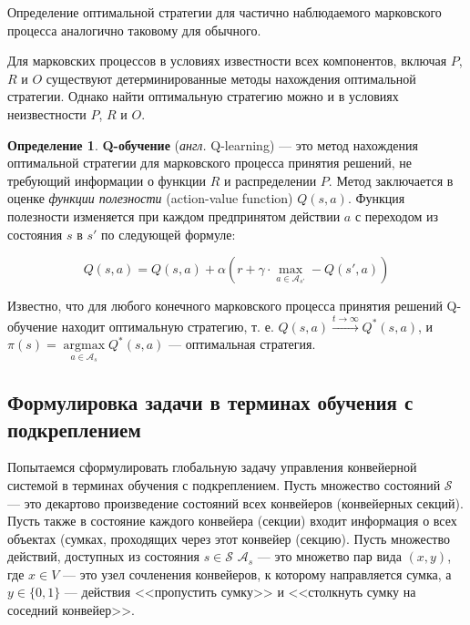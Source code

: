 \documentclass[specification,annotation,times]{itmo-student-thesis}
\DeclareMathOperator{\argmax}{argmax}
\theoremstyle{definition}
\newtheorem{definition-ru}{Определение}
\begin{document}
Определение оптимальной стратегии для частично наблюдаемого марковского процесса
аналогично таковому для обычного.

Для марковских процессов в условиях известности всех компонентов, включая $P$,
$R$ и $O$ существуют детерминированные методы нахождения оптимальной стратегии.
Однако найти оптимальную стратегию можно и в условиях неизвестности $P$, $R$ и $O$.

\begin{definition-ru}
  \textbf{Q-обучение} (\textit{англ.} Q-learning) \cite{q-learning-orig} --- это метод нахождения
  оптимальной стратегии для марковского процесса принятия решений, не требующий
  информации о функции $R$ и распределении $P$. Метод заключается в оценке
  \textit{функции полезности} (action-value function)
  $Q(s,a)$. Функция полезности изменяется при каждом предпринятом действии $a$ с
  переходом из состояния $s$ в $s'$ по следующей формуле:

  \begin{equation}
    Q(s, a) = Q(s, a) + \alpha \left( r +
    \gamma \cdot \max\limits_{a \in \mathcal{A}_{s'}} - Q(s', a) \right)
  \end{equation}
\end{definition-ru}

Известно, что для любого конечного марковского процесса принятия решений
Q-обучение находит оптимальную стратегию, т. е. $Q(s, a) \xrightarrow{t
  \rightarrow \infty} Q^*(s, a)$, и $\pi(s) = \argmax\limits_{a \in
  \mathcal{A}_s} {Q^*(s, a)}$ --- оптимальная стратегия.

\subsection{Формулировка задачи в терминах обучения с подкреплением}\label{rl-task-formulation}

Попытаемся сформулировать глобальную задачу управления конвейерной системой в
терминах обучения с подкреплением. Пусть множество состояний $\mathcal{S}$ ---
это декартово произведение состояний всех конвейеров (конвейерных секций). Пусть
также в состояние каждого конвейера (секции) входит информация о всех объектах
(сумках, проходящих через этот конвейер (секцию). Пусть множество действий,
доступных из состояния $s \in \mathcal{S}$ $\mathcal{A}_s$ --- это множетво пар
вида $(x,y)$, где $x \in V$ --- это узел сочленения конвейеров, к которому
направляется сумка, а $y \in \{ 0, 1 \}$ --- действия <<пропустить сумку>> и
<<столкнуть сумку на соседний конвейер>>.
\end{document}
